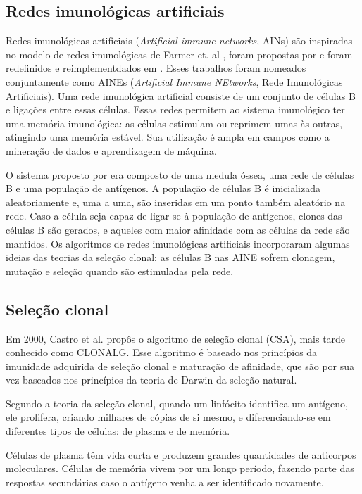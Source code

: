 \subsection{Redes imunológicas artificiais}

Redes imunológicas artificiais (\emph{Artificial immune networks}, AINs) são inspiradas no modelo de redes imunológicas de Farmer et. al \cite{Farmer1986}, foram propostas por \citet{Ishida1990} e foram redefinidos e reimplementdados em \citet{Timmis2000}. Esses trabalhos foram nomeados conjuntamente como AINEs (\emph{Artificial Immune NEtworks}, Rede Imunológicas Artificiais). Uma rede imunológica artificial consiste de um conjunto de células B e ligações entre essas células. Essas redes permitem ao sistema imunológico ter uma memória imunológica: as células estimulam ou reprimem umas às outras, atingindo uma memória estável. Sua utilização é ampla em campos como a mineração de dados e aprendizagem de máquina. 

O sistema proposto por \citeauthor{Timmis2000} era composto de uma medula óssea, uma rede de células B e uma população de antígenos. A população de células B é inicializada aleatoriamente e, uma a uma, são inseridas em um ponto também aleatório na rede. Caso a célula seja capaz de ligar-se à população de antígenos, clones das células B são gerados, e aqueles com maior afinidade com as células da rede são mantidos. Os algoritmos de redes imunológicas artificiais incorporaram algumas ideias das teorias da seleção clonal: as células B nas AINE sofrem clonagem, mutação e seleção quando são estimuladas pela rede.

\subsection{Seleção clonal}
\label{sec:ais_clonalg}

Em 2000, Castro et al.\cite{Castro2000} propôs o algoritmo de seleção clonal (CSA), mais tarde conhecido como CLONALG. Esse algoritmo é baseado nos princípios da imunidade adquirida de seleção clonal e maturação de afinidade, que são por sua vez baseados nos princípios da teoria de Darwin da seleção natural.

Segundo a teoria da seleção clonal, quando um linfócito identifica um antígeno, ele prolifera, criando milhares de cópias de si mesmo, e diferenciando-se em diferentes tipos de células: de plasma e de memória.

Células de plasma têm vida curta e produzem grandes quantidades de anticorpos moleculares. Células de memória vivem por um longo período, fazendo parte das respostas secundárias caso o antígeno venha a ser identificado novamente.

